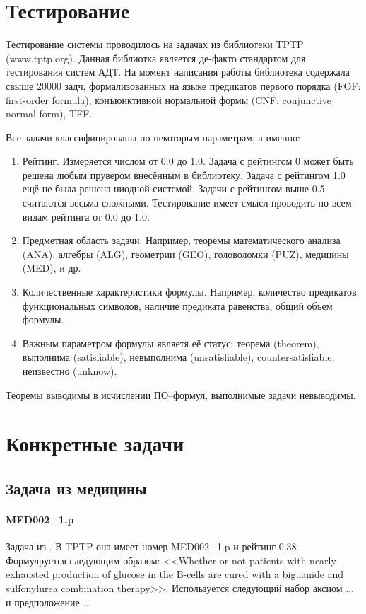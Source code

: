 \section{Тестирование}

Тестирование системы проводилось на задачах из библиотеки TPTP (www.tptp.org). Данная библиотка является де-факто стандартом для тестирования систем АДТ. На момент написания работы библиотека содержала свыше 20000 задч, формализованных на языке предикатов первого порядка (FOF: first-order formula), конъюнктивной нормальной формы (CNF: conjunctive normal form), TFF.

Все задачи классифицированы по некоторым параметрам, а именно:
\begin{enumerate}
\item Рейтинг. Измеряется числом от 0.0 до 1.0. Задача с рейтингом 0 может быть решена любым прувером внесённым в библиотеку. Задача с рейтингом 1.0 ещё не была решена ниодной системой. Задачи с рейтингом выше 0.5 считаются весьма сложными. Тестирование имеет смысл проводить по всем видам рейтинга от 0.0 до 1.0.
\item Предметная область задачи. Например, теоремы математического анализа (ANA), алгебры (ALG), геометрии (GEO), головоломки (PUZ), медицины (MED), и др.
\item Количественные характеристики формулы. Например, количество предикатов, функциональных символов, наличие предиката равенства, общий объем формулы.
\item Важным параметром формулы являетя её статус: теорема (theorem), выполнима (satisfiable), невыполнима (unsatisfiable), countersatisfiable, неизвестно (unknow).
\end{enumerate}

Теоремы выводимы в исчислении ПО--формул, выполнимые задачи невыводимы.


\section{Конкретные задачи}

\subsection{Задача из медицины}
\paragraph{MED002+1.p}
Задача из \cite{med1}. В TPTP она имеет номер MED002+1.p и рейтинг 0.38.
Формулруется следующим образом: <<Whether or not patients with nearly-exhausted production of glucose in the B-cells are cured with a biguanide and sulfonylurea combination therapy>>. Используется следующий набор аксиом ... и предположение ...

